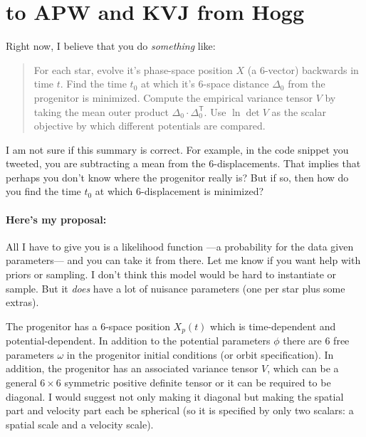 \documentclass[12pt,letterpaper]{article}
\newcommand{\TT}{{\!\mathsf{T}}}
\begin{document}
\section*{to APW and KVJ from Hogg}

Right now, I believe that you do \emph{something} like:
\begin{quote}
For each star,
evolve it's phase-space position $X$ (a 6-vector) backwards in time $t$.
Find the time $t_0$ at which it's 6-space distance $\Delta_0$ from the progenitor is minimized.
Compute the empirical variance tensor $V$ by taking the mean outer product $\Delta_0\cdot \Delta_0^\TT$.
Use $\ln\det V$ as the scalar objective by which different potentials are compared.
\end{quote}
I am not sure if this summary is correct.
For example, in the code snippet you tweeted, you are subtracting a mean from the 6-displacements.
That implies that perhaps you don't know where the progenitor really is?
But if so, then how do you find the time $t_0$ at which 6-displacement is minimized?

\paragraph{Here's my proposal:}
All I have to give you is a likelihood function%
---a probability for the data given parameters---%
and you can take it from there.
Let me know if you want help with priors or sampling.
I don't think this model would be hard to instantiate or sample.
But it \emph{does} have a lot of nuisance parameters (one per star plus some extras).

The progenitor has a 6-space position $X_p(t)$ which is time-dependent and potential-dependent.
In addition to the potential parameters $\phi$
there are 6 free parameters $\omega$ in the progenitor initial conditions (or orbit specification).
In addition, the progenitor has an associated variance tensor $V$,
which can be a general $6\times 6$ symmetric positive definite tensor or it can be required to be diagonal.
I would suggest not only making it diagonal but making the spatial part and velocity part each be spherical
(so it is specified by only two scalars: a spatial scale and a velocity scale).
\end{document}
